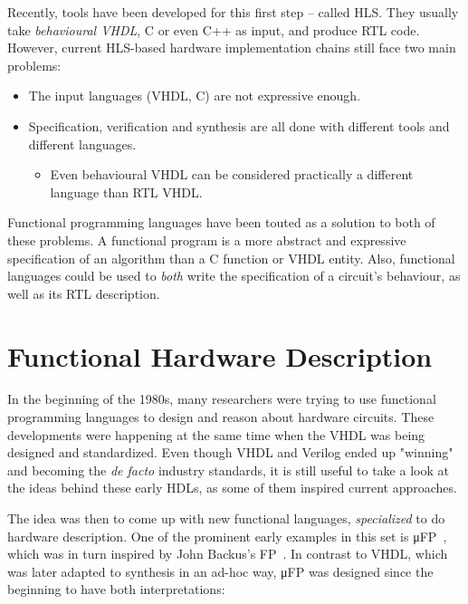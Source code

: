         Recently, tools have been developed for this first step -- called \ac{HLS}.
        They usually take \emph{behavioural \acs{VHDL}}, C or even C++ as input, and produce \ac{RTL} code.
        However, current \acs{HLS}-based hardware implementation chains still face two main problems:

        \begin{itemize}
            \item The input languages (VHDL, C) are not expressive enough.
            \item Specification, verification and synthesis are all done with different tools and different languages.
            \begin{itemize}
                \item Even behavioural \acs{VHDL} can be considered practically a different language
                    than \acl{RTL} \acs{VHDL}.
            \end{itemize}
        \end{itemize}

        Functional programming languages have been touted as a solution to both of these problems.
        A functional program is a more abstract and expressive specification of an algorithm than
        a C function or VHDL entity.
        Also, functional languages could be used to \emph{both} write the specification of a circuit's behaviour,
        as well as its \acl{RTL} description.


    \section{Functional Hardware Description}
    \label{sec:functional-hardware}
        In the beginning of the 1980s, many researchers were trying to use functional programming languages
        to design and reason about hardware circuits.
        These developments were happening at the same time when the \ac{VHDL} was being designed and standardized.
        Even though \ac{VHDL} and Verilog ended up "winning" and becoming the \emph{de facto} industry standards,
        it is still useful to take a look at the ideas behind these early \acp{HDL}, as some of them
        inspired current approaches.

        The idea was then to come up with new functional languages, \emph{specialized} to do hardware description.
        One of the prominent early examples in this set is μFP~\cite{mufp-1984},
        which was in turn inspired by John Backus's FP~\cite{backus-turing-lecture}.
        In contrast to \ac{VHDL}, which was later adapted to synthesis in an ad-hoc way,
        μFP was designed since the beginning to have both interpretations:

